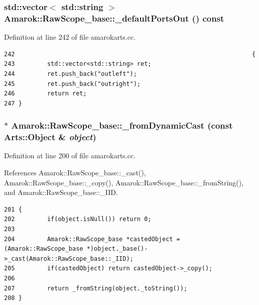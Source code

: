 \subsubsection{\setlength{\rightskip}{0pt plus 5cm}std::vector$<$ std::string $>$ Amarok::Raw\-Scope\_\-base::\_\-default\-Ports\-Out () const\hspace{0.3cm}{\tt  [virtual, inherited]}}\label{classAmarok_1_1RawScope__base_Amarok_1_1RawScope__stuba6}




Definition at line 242 of file amarokarts.cc.



\footnotesize\begin{verbatim}242                                                                  {
243         std::vector<std::string> ret;
244         ret.push_back("outleft");
245         ret.push_back("outright");
246         return ret;
247 }
\end{verbatim}\normalsize 
{}
\subsubsection{ $\ast$ Amarok::Raw\-Scope\_\-base::\_\-from\-Dynamic\-Cast (const Arts::Object \& {\em object})\hspace{0.3cm}{\tt  [static, inherited]}}\label{classAmarok_1_1RawScope__base_Amarok_1_1RawScope__stube3}




Definition at line 200 of file amarokarts.cc.

References Amarok::Raw\-Scope\_\-base::\_\-cast(), Amarok::Raw\-Scope\_\-base::\_\-copy(), Amarok::Raw\-Scope\_\-base::\_\-from\-String(), and Amarok::Raw\-Scope\_\-base::\_\-IID.



\footnotesize\begin{verbatim}201 {
202         if(object.isNull()) return 0;
203 
204         Amarok::RawScope_base *castedObject = (Amarok::RawScope_base *)object._base()->_cast(Amarok::RawScope_base::_IID);
205         if(castedObject) return castedObject->_copy();
206 
207         return _fromString(object._toString());
208 }
\end{verbatim}\normalsize 


